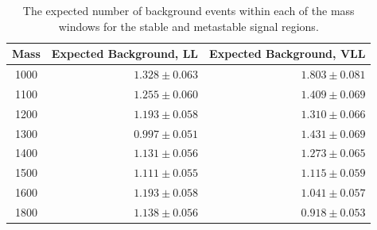 \begin{table}
\centering
\begin{tabular}{crr}
  \hline
  Mass & Expected Background, \ac{LL} & Expected Background, \ac{VLL} \\
  \hline
  1000 & $1.328 \pm 0.063 $ & $1.803 \pm 0.081 $ \\
  1100 & $1.255 \pm 0.060 $ & $1.409 \pm 0.069 $ \\
  1200 & $1.193 \pm 0.058 $ & $1.310 \pm 0.066 $ \\
  1300 & $0.997 \pm 0.051 $ & $1.431 \pm 0.069 $ \\
  1400 & $1.131 \pm 0.056 $ & $1.273 \pm 0.065 $ \\
  1500 & $1.111 \pm 0.055 $ & $1.115 \pm 0.059 $ \\
  1600 & $1.193 \pm 0.058 $ & $1.041 \pm 0.057 $ \\
  1800 & $1.138 \pm 0.056 $ & $0.918 \pm 0.053 $ \\
  \hline
\end{tabular}
\caption{The expected number of background events within each of the mass windows for the stable and metastable signal regions.}
\label{tab:background_yields}
\end{table}

